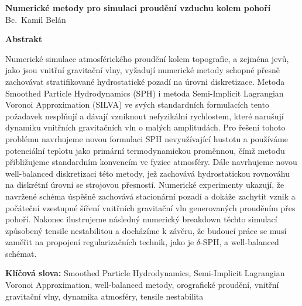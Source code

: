 \documentclass[11pt]{article}
\newcommand{\ThesisTitleCS}{Numerické metody pro simulaci proudění vzduchu kolem pohoří}
\newcommand{\ThesisAuthorCS}{Bc.\ Kamil Belán}
\newcommand{\KeywordsCS}{Smoothed Particle Hydrodynamics, Semi-Implicit Lagrangian Voronoi Approximation, well-balanced metody, orografické proudění, vnitřní gravitační vlny, dynamika atmosféry, tensile nestabilita}
\begin{document}
\begin{center}
  {\large\bfseries \ThesisTitleCS}\\[0.4em]
  {\normalsize \ThesisAuthorCS}
\end{center}

\bigskip
{\large\bfseries Abstrakt}\par\medskip
	Numerické simulace atmosférického proudění kolem topografie, a zejména jevů, jako jsou vnitřní gravitační vlny, vyžadují numerické metody schopné přesně zachovávat stratifikované hydrostatické pozadí na úrovni diskretizace. Metoda Smoothed Particle Hydrodynamics (SPH) i metoda Semi-Implicit Lagrangian Voronoi Approximation (SILVA) ve svých standardních formulacích tento požadavek nesplňují a dávají vzniknout nefyzikální rychlostem, které narušují dynamiku vnitřních gravitačních vln o malých amplitudách. Pro řešení tohoto problému navrhujeme novou formulaci SPH nevyužívající hustotu a používáme potenciální teplotu jako primární termodynamickou proměnnou, čímž metodu přibližujeme standardním konvencím ve fyzice atmosféry. Dále navrhujeme novou well-balanced diskretizaci této metody, jež zachovává hydrostatickou rovnováhu na diskrétní úrovni se strojovou přesností. Numerické experimenty ukazují, že navržené schéma úspěšně zachovává stacionární pozadí a dokáže zachytit vznik a počáteční vzestupné šíření vnitřních gravitační vln generovaných prouděním přes pohoří. Nakonec ilustrujeme následný numerický breakdown těchto simulací způsobený tensile nestabilitou a docházíme k závěru, že budoucí práce se musí zaměřit na propojení regularizačních technik, jako je $\delta$-SPH, a well-balanced schémat.

\bigskip
\noindent\textbf{Klíčová slova:} \KeywordsCS
\end{document}
